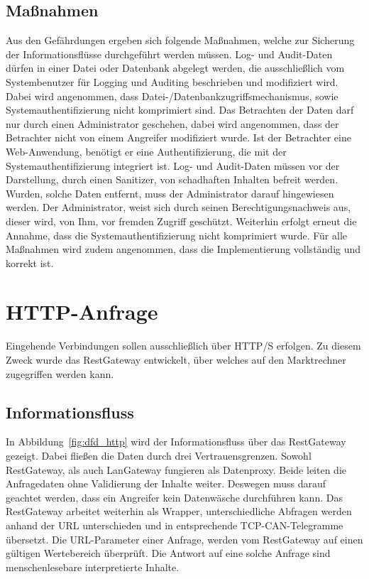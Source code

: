 \documentclass[11pt,a4paper]{report}
\begin{document}
\subsection{Maßnahmen}

Aus den Gefährdungen ergeben sich folgende Maßnahmen, welche zur Sicherung der Informationsflüsse durchgeführt werden müssen. Log- und Audit-Daten dürfen in einer Datei oder Datenbank abgelegt werden, die ausschließlich vom Systembenutzer für Logging und Auditing beschrieben und modifiziert wird. Dabei wird angenommen, dass Datei-/Datenbankzugriffsmechanismus, sowie Systemauthentifizierung nicht komprimiert sind. Das Betrachten der Daten darf nur durch einen Administrator geschehen, dabei wird angenommen, dass der Betrachter nicht von einem Angreifer modifiziert wurde. Ist der Betrachter eine Web-Anwendung, benötigt er eine Authentifizierung, die mit der Systemauthentifizierung integriert ist. Log- und Audit-Daten müssen vor der Darstellung, durch einen Sanitizer, von schadhaften Inhalten befreit werden. Wurden, solche Daten entfernt, muss der Administrator darauf hingewiesen werden. Der Administrator, weist sich durch seinen Berechtigungsnachweis aus, dieser wird, von Ihm, vor fremden Zugriff geschützt. Weiterhin erfolgt erneut die Annahme, dass die Systemauthentifizierung nicht komprimiert wurde. Für alle Maßnahmen wird zudem angenommen, dass die Implementierung vollständig und korrekt ist.

\section{HTTP-Anfrage} \label{sec:model_http}

Eingehende Verbindungen sollen ausschließlich über HTTP/S erfolgen. Zu diesem Zweck wurde das RestGateway entwickelt, über welches auf den Marktrechner zugegriffen werden kann. 

\subsection{Informationsfluss}

In Abbildung~\ref{fig:dfd_http} wird der Informationsfluss über das RestGateway gezeigt. Dabei fließen die Daten durch drei Vertrauensgrenzen. Sowohl RestGateway, als auch LanGateway fungieren als Datenproxy. Beide leiten die Anfragedaten ohne Validierung der Inhalte weiter. Deswegen muss darauf geachtet werden, dass ein Angreifer kein Datenwäsche durchführen kann. Das RestGateway arbeitet weiterhin als Wrapper, unterschiedliche Abfragen werden anhand der URL unterschieden und in entsprechende TCP-CAN-Telegramme übersetzt. Die URL-Parameter einer Anfrage, werden vom RestGateway auf einen gültigen Wertebereich überprüft. Die Antwort auf eine solche Anfrage sind menschenlesebare interpretierte Inhalte.
\end{document}
